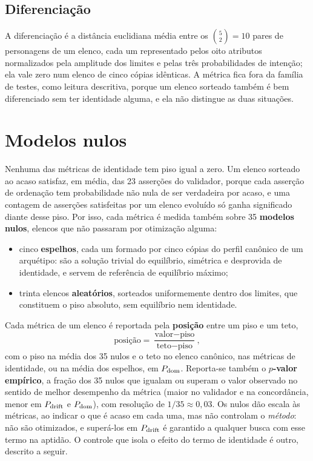 \subsection{Diferenciação}
\label{sub: diferenciacao}

A diferenciação é a distância euclidiana média entre os $\binom{5}{2} = 10$ pares de personagens de um elenco, cada um representado pelos oito atributos normalizados pela amplitude dos limites e pelas três probabilidades de intenção; ela vale zero num elenco de cinco cópias idênticas. A métrica fica fora da família de testes, como leitura descritiva, porque um elenco sorteado também é bem diferenciado sem ter identidade alguma, e ela não distingue as duas situações.

\section{Modelos nulos}
\label{sec: nulos}

Nenhuma das métricas de identidade tem piso igual a zero. Um elenco sorteado ao acaso satisfaz, em média, \nuloValMedioAleat{} das 23 asserções do validador, porque cada asserção de ordenação tem probabilidade não nula de ser verdadeira por acaso, e uma contagem de asserções satisfeitas por um elenco evoluído só ganha significado diante desse piso. Por isso, cada métrica é medida também sobre 35 \textbf{modelos nulos}, elencos que não passaram por otimização alguma:

\begin{itemize}
    \item cinco \textbf{espelhos}, cada um formado por cinco cópias do perfil canônico de um arquétipo: são a solução trivial do equilíbrio, simétrica e desprovida de identidade, e servem de referência de equilíbrio máximo;
    \item trinta elencos \textbf{aleatórios}, sorteados uniformemente dentro dos limites, que constituem o piso absoluto, sem equilíbrio nem identidade.
\end{itemize}

Cada métrica de um elenco é reportada pela \textbf{posição} entre um piso e um teto,
\begin{equation}
    \label{eq: posicao}
    \text{posição} = \frac{\text{valor} - \text{piso}}{\text{teto} - \text{piso}},
\end{equation}
com o piso na média dos 35 nulos e o teto no elenco canônico, nas métricas de identidade, ou na média dos espelhos, em $P_{\mathrm{dom}}$. Reporta-se também o \textbf{$p$-valor empírico}, a fração dos 35 nulos que igualam ou superam o valor observado no sentido de melhor desempenho da métrica (maior no validador e na concordância, menor em $P_{\mathrm{drift}}$ e $P_{\mathrm{dom}}$), com resolução de $1/35 \approx 0{,}03$. Os nulos dão escala às métricas, ao indicar o que é acaso em cada uma, mas não controlam o \textit{método}: não são otimizados, e superá-los em $P_{\mathrm{drift}}$ é garantido a qualquer busca com esse termo na aptidão. O controle que isola o efeito do termo de identidade é outro, descrito a seguir.

